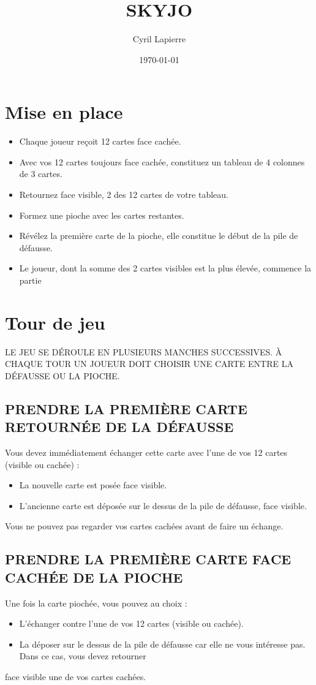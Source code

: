 \documentclass{article}%
\title{SKYJO}%
\author{Cyril Lapierre}%
\date{\today}%
\begin{document}
%
\pagestyle{empty}%
\normalsize%
\maketitle%
\section{ Mise en place
}%
\label{sec:Miseenplace}%
\begin{itemize}%
\item%
%
 Chaque joueur reçoit 12 cartes face cachée.
%
\item%
%
 Avec vos 12 cartes toujours face cachée, constituez un tableau de 4 colonnes de 3 cartes.
%
\item%
%
 Retournez face visible, 2 des 12 cartes de votre tableau.
%
\item%
%
 Formez une pioche avec les cartes restantes.
%
\item%
%
 Révélez la première carte de la pioche, elle constitue le début de la pile de défausse.
%
\item%
%
 Le joueur, dont la somme des 2 cartes visibles est la plus élevée, commence la partie
%
\end{itemize}

%
\section{ Tour de jeu
}%
\label{sec:Tourdejeu}%
LE JEU SE DÉROULE EN PLUSIEURS MANCHES SUCCESSIVES. À CHAQUE TOUR UN JOUEUR DOIT CHOISIR UNE CARTE ENTRE LA DÉFAUSSE OU LA PIOCHE.


%
\subsection{ PRENDRE LA PREMIÈRE CARTE RETOURNÉE DE LA DÉFAUSSE
}%
\label{subsec:PRENDRELAPREMIRECARTERETOURNEDELADFAUSSE}%
Vous devez immédiatement échanger cette carte avec l’une de vos 12 cartes (visible ou cachée) :
%
\begin{itemize}%
\item%
%
 La nouvelle carte est posée face visible.
%
\item%
%
 L'ancienne carte est déposée sur le dessus de la pile de défausse, face visible.
%
\end{itemize}%
Vous ne pouvez pas regarder vos cartes cachées avant de faire un échange.


%
\subsection{ PRENDRE LA PREMIÈRE CARTE FACE CACHÉE DE LA PIOCHE
}%
\label{subsec:PRENDRELAPREMIRECARTEFACECACHEDELAPIOCHE}%
Une fois la carte piochée, vous pouvez au choix :
%
\begin{itemize}%
\item%
%
 L'échanger contre l'une de vos 12 cartes (visible ou cachée).
%
\item%
%
 La déposer sur le dessus de la pile de défausse car elle ne vous intéresse pas. Dans ce cas, vous devez retourner
%
\end{itemize}%
face visible une de vos cartes cachées.
\end{document}
